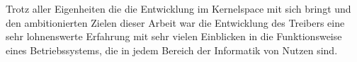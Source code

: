 Trotz aller Eigenheiten die die Entwicklung im Kernelspace mit sich bringt und den ambitionierten Zielen dieser Arbeit war die Entwicklung des Treibers eine sehr lohnenswerte Erfahrung mit sehr vielen Einblicken in die Funktionsweise eines Betriebssystems, die in jedem Bereich der Informatik von Nutzen sind. 

 